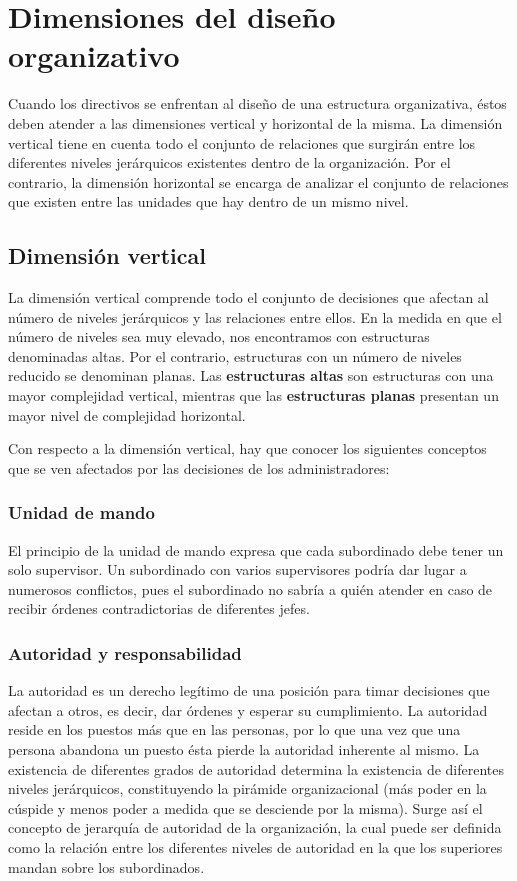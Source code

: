 \documentclass[12pt,a4paper,spanish]{report}
\begin{document}
	\section{\textcolor[rgb]{0.5,0.1,0.4}Dimensiones del diseño organizativo}
		Cuando los directivos se enfrentan al diseño de una estructura organizativa, éstos deben atender a las dimensiones vertical y horizontal de la misma. La dimensión vertical tiene en cuenta todo el conjunto de relaciones que surgirán entre los diferentes niveles jerárquicos existentes dentro de la organización. Por el contrario, la dimensión horizontal se encarga de analizar el conjunto de relaciones que existen entre las unidades que hay dentro de un mismo nivel.

		\subsection{\textcolor[rgb]{0.5,0.1,0.4}Dimensión vertical}
			La dimensión vertical comprende todo el conjunto de decisiones que afectan al número de niveles jerárquicos y las relaciones entre ellos. En la medida en que el número de niveles sea muy elevado, nos encontramos con estructuras denominadas altas. Por el contrario, estructuras con un número de niveles reducido se denominan planas. Las \textbf{estructuras altas} son estructuras con una mayor complejidad vertical, mientras que las \textbf{estructuras planas} presentan un mayor nivel de complejidad horizontal.

			Con respecto a la dimensión vertical, hay que conocer los siguientes conceptos que se ven afectados por las decisiones de los administradores:
			\subsubsection{\textcolor[rgb]{0.5,0.1,0.4}Unidad de mando}
				El principio de la unidad de mando expresa que cada subordinado debe tener un solo supervisor. Un subordinado con varios supervisores podría dar lugar a numerosos conflictos, pues el subordinado no sabría a quién atender en caso de recibir órdenes contradictorias de diferentes jefes.

			\subsubsection{\textcolor[rgb]{0.5,0.1,0.4}Autoridad y responsabilidad}
				La autoridad es un derecho legítimo de una posición para timar decisiones que afectan a otros, es decir, dar órdenes y esperar su cumplimiento. La autoridad reside en los puestos más que en las personas, por lo que una vez que una persona abandona un puesto ésta pierde la autoridad inherente al mismo. La existencia de diferentes grados de autoridad determina la existencia de diferentes niveles jerárquicos, constituyendo la pirámide organizacional (más poder en la cúspide y menos poder a medida que se desciende por la misma). Surge así el concepto de jerarquía de autoridad de la organización, la cual puede ser definida como la relación entre los diferentes niveles de autoridad en la que los superiores mandan sobre los subordinados.
\end{document}
